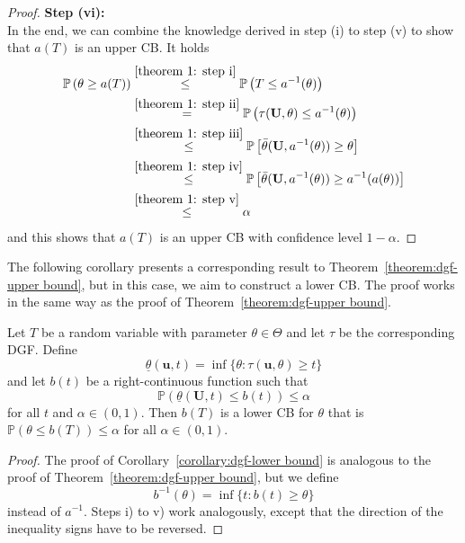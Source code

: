 \begin{proof}
	\textbf{Step (vi):} \\
	In the end, we can combine the knowledge derived in step (i) to step (v) to show that $a(T)$ is an upper CB. It holds
	\begin{align*}
		\mathbb{P} \left( \theta \geq a(T) \right)
		&\overset{\eqref{theorem 1: step i}}{\leq}
		\mathbb{P} \left( T \leq a^{-1}(\theta) \right) \\
		&\overset{\eqref{theorem 1: step ii}}{=}
		\mathbb{P} \left( \tau(\mathbf U, \theta) \leq a^{-1}(\theta) \right) \\
		&\overset{\eqref{theorem 1: step iii}}{\leq}
		\mathbb{P} \left[
		\bar \theta (\mathbf U, a^{-1}(\theta)) \geq \theta
		\right] \\
		&\overset{\eqref{theorem 1: step iv}}{\leq}
		\mathbb{P} \left[ 
		\bar \theta (\mathbf U, a^{-1}(\theta)) \geq a^{-1}(a(\theta))
		\right] \\
		&\overset{\eqref{theorem 1: step v}}{\leq}
		\alpha
	\end{align*}
	and this shows that $a(T)$ is an upper CB with confidence level $1 - \alpha$.
	
\end{proof}


The following corollary presents a corresponding result to Theorem~\ref{theorem:dgf-upper bound}, but in this case, we aim to construct a lower CB.
The proof works in the same way as the proof of Theorem~\ref{theorem:dgf-upper bound}.


\begin{corollary} \label{corollary:dgf-lower bound}
	Let $T$ be a random variable with parameter $\theta \in \Theta$ and let $\tau$ be the corresponding DGF. Define
	\[
		\underline \theta (\mathbf u, t) = \inf \{\theta: \tau(\mathbf u, \theta) \geq t\}
	\]
	and let $b(t)$ be a right-continuous function such that
	\[
	\mathbb{P} \left( \underline \theta (\mathbf U, t)  \leq b(t)\right) \leq \alpha
	\]
	for all $t$ and $\alpha \in (0, 1)$. 
	Then $b(T)$ is a lower CB for $\theta$ that is $\mathbb{P} \left( \theta \leq b(T) \right) \leq \alpha $ for all $\alpha \in (0, 1)$.
\end{corollary}

\begin{proof}
	The proof of Corollary~\ref{corollary:dgf-lower bound} is analogous to the proof of Theorem~\ref{theorem:dgf-upper bound}, but we define
	\[
	b^{-1}(\theta) = \inf \{ t: b(t) \geq \theta \}
	\]
	instead of $a^{-1}$. Steps i) to v) work analogously, except that the direction of the inequality signs have to be reversed.
\end{proof}



